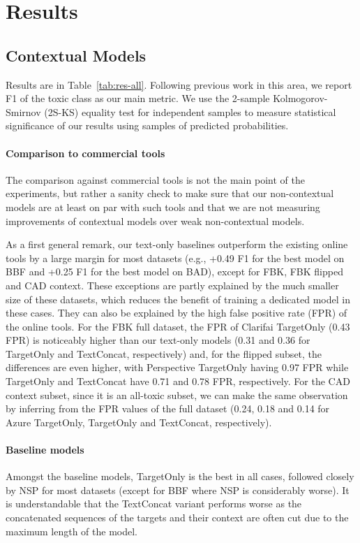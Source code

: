 \documentclass[acmsmall]{acmart}
\begin{document}
\section{Results} \label{section:results}

\subsection{Contextual Models}
Results are in Table~\ref{tab:res-all}. Following previous work in this area, we report F1 of the toxic class as our main metric. We use the 2-sample Kolmogorov-Smirnov (2S-KS) equality test for independent samples to measure statistical significance of our results using samples of predicted probabilities.

\paragraph{Comparison to commercial tools} The comparison against commercial tools is not the main point of the experiments, but rather a sanity check to make sure that our non-contextual models are at least on par with such tools and that we are not measuring improvements of contextual models over weak non-contextual models. 

As a first general remark, our text-only baselines outperform the existing online tools by a large margin for most datasets (e.g., +0.49 F1 for the best model on BBF and +0.25 F1 for the best model on BAD), except for FBK, FBK flipped and CAD context. These exceptions are partly explained by the much smaller size of these datasets, which reduces the benefit of training a dedicated model in these cases. They can also be explained by the high false positive rate (FPR) of the online tools. For the FBK full dataset, the FPR of Clarifai TargetOnly (0.43 FPR) is noticeably higher than our text-only models (0.31 and 0.36 for TargetOnly and TextConcat, respectively) and, for the flipped subset, the differences are even higher, with Perspective TargetOnly having 0.97 FPR while TargetOnly and TextConcat have 0.71 and 0.78 FPR, respectively. For the CAD context subset, since it is an all-toxic subset, we can make the same observation by inferring from the FPR values of the full dataset (0.24, 0.18 and 0.14 for Azure TargetOnly, TargetOnly and TextConcat, respectively).

\paragraph{Baseline models} Amongst the baseline models, TargetOnly is the best in all cases, followed closely by NSP for most datasets (except for BBF where NSP is considerably worse). It is understandable that the TextConcat variant performs worse as the concatenated sequences of the targets and their context are often cut due to the maximum length of the model.
\end{document}
